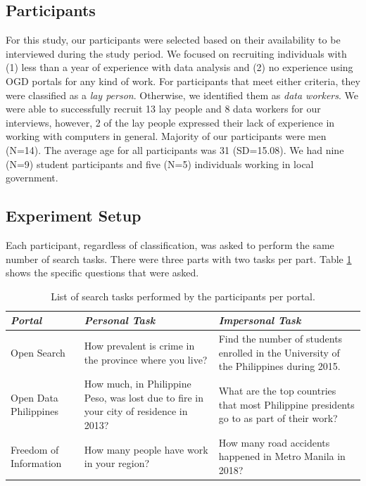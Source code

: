 \documentclass{sigchi}
\begin{document}
\subsection{Participants}
For this study, our participants were selected based on their availability to be interviewed during the study period. We focused on recruiting individuals with (1) less than a year of experience with data analysis and (2) no experience using OGD portals for any kind of work. For participants that meet either criteria, they were classified as a \textit{lay person}. Otherwise, we identified them as \textit{data workers}. We were able to successfully recruit 13 lay people and 8 data workers for our interviews, however, 2 of the lay people expressed their lack of experience in working with computers in general. Majority of our participants were men (N=14). The average age for all participants was 31 (SD=15.08). We had nine (N=9) student participants and five (N=5) individuals working in local government.


\subsection{Experiment Setup}
Each participant, regardless of classification, was asked to perform the same number of search tasks. There were three parts with two tasks per part. Table \ref{tab:searchtasks} shows the specific questions that were asked. 

\begin{table}[t]
 \centering
 \begin{tabular}{l p{6.5cm} p{6.5cm}}
  \toprule
  \textbf{\textit{Portal}}
  & \textbf{\textit{Personal Task}}
   & \textbf{\textit{Impersonal Task}}\\
  \midrule
  Open Search & How prevalent is crime in the province where you live? & Find the number of students enrolled in the University of the Philippines during 2015.\\
  \midrule
  Open Data Philippines & How much, in Philippine Peso, was lost due to fire in your city of residence in 2013? & What are the top countries that most Philippine presidents go to as part of their work? \\
  \midrule
  Freedom of Information & How many people have work in your region? & How many road accidents happened in Metro Manila in 2018?\\
  \bottomrule
 \end{tabular}
 \caption{List of search tasks performed by the participants per portal.}~\label{tab:searchtasks}
\end{table}
\end{document}
